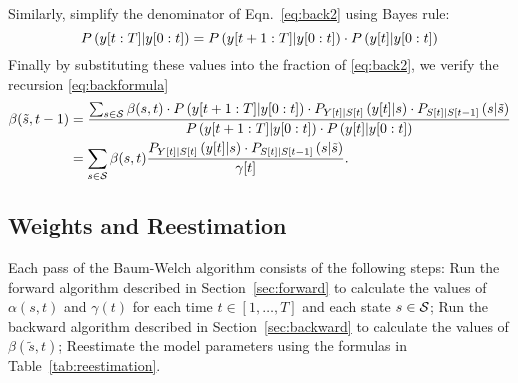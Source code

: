 Similarly, simplify the denominator of Eqn.~\eqref{eq:back2} using
Bayes rule:
\begin{equation*}
  P \left(y[t:T]|y[0:t] \right) = P
  \left(y[t+1:T]|y[0:t]  \right) \cdot {P \left(
  {y}{[t]}|y[0:t]\right)}
\end{equation*}
Finally by substituting these values into the fraction of
\eqref{eq:back2}, we verify the recursion \eqref{eq:backformula}
\begin{align}
  \mlabel{eq:back3} \beta({\tilde s},t-1) &= \frac{\sum_{s\in\states}
    \beta(s,t) \cdot P \left(\ts{y}{t+1}{T}|\ts{y}{0}{t} \right)
    \cdot P_{\ti{Y}{t}|\ti{S}{t}} \left(\ti{y}{t}|s \right) \cdot
    P_{\ti{S}{t}|\ti{S}{t-1}} \left(s|{\tilde s} \right)} {P
    \left(\ts{y}{t+1}{T}|\ts{y}{0}{t} \right) \cdot {P \left(
        \ti{y}{t}|\ts{y}{0}{t}\right)}} \\
  \mlabel{eq:back4} &= \sum_{s\in\states} \beta(s,t) \frac{
    P_{\ti{Y}{t}|\ti{S}{t}} \left(\ti{y}{t}|s \right) \cdot
    P_{\ti{S}{t}|\ti{S}{t-1}} \left(s|{\tilde s} \right)} {\ti{\gamma}{t}}.
\end{align}

\subsection{Weights and Reestimation}
\label{sec:reestimation}

Each pass of the Baum-Welch algorithm consists of the following steps:
Run the forward algorithm described in Section~\ref{sec:forward} to
calculate the values of $\alpha(s,t)$ and $\gamma(t)$ for each time $t
\in [1,\ldots,T]$ and each state $s \in \states$; Run the backward
algorithm described in Section~\ref{sec:backward} to calculate the
values of $\beta({\tilde s},t)$; Reestimate the model parameters using the
formulas in Table~\ref{tab:reestimation}.

